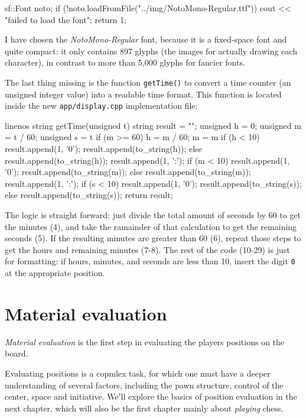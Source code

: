 \begin{cpp}
sf::Font noto;
if (!noto.loadFromFile("../img/NotoMono-Regular.ttf")) {
  cout << "failed to load the font\n";
  return 1;
}
\end{cpp}

I have chosen the \emph{NotoMono-Regular} font, because it is a fixed-space font and quite compact:
it only contains 897 glyphs (the images for actually drawing each character), in contrast to
more than 5,000 glyphs for fancier fonts.

The last thing missing is the function \texttt{getTime()} to convert a time counter (an unsigned
integer value) into a readable time format. This function is located inside the new
\texttt{app/display.cpp} implementation file:

\begin{cpp*}{linenos}
string getTime(unsigned t) {
  string result = "";
  unsigned h = 0;
  unsigned m = t / 60;
  unsigned s = t %
  if (m >= 60) {
    h = m / 60;
    m = m %
  }
  if (h < 10) {
    result.append(1, '0');
    result.append(to_string(h));
  } else {
    result.append(to_string(h));
  }
  result.append(1, ':');
  if (m < 10) {
    result.append(1, '0');
    result.append(to_string(m));
  } else {
    result.append(to_string(m));
  }
  result.append(1, ':');
  if (s < 10) {
    result.append(1, '0');
    result.append(to_string(s));
  } else {
    result.append(to_string(s));
  }
  return result;
}
\end{cpp*}

The logic is straight forward: just divide the total amount of seconds by 60 to get the minutes (4),
and take the ramainder of that calculation to get the remaining seconds (5).
If the resulting minutes are greater than 60 (6), repeat those steps to get the hours and remaining
minutes (7-8).
The rest of the code (10-29) is just for formatting: if hours, minutes, and seconds are less than 10,
insert the digit \texttt{0}  at the appropriate position.

\section{Material evaluation}

\emph{Material evaluation} is the first step in evaluating the players positions on the board.

Evaluating positions is a copmlex task, for which one must have a deeper understanding of
several factors, including the pawn structure, control of the center, space and initiative.
We'll explore the basics of position evaluation in the next chapter, which will also be the first
chapter mainly about \emph{playing} chess.

